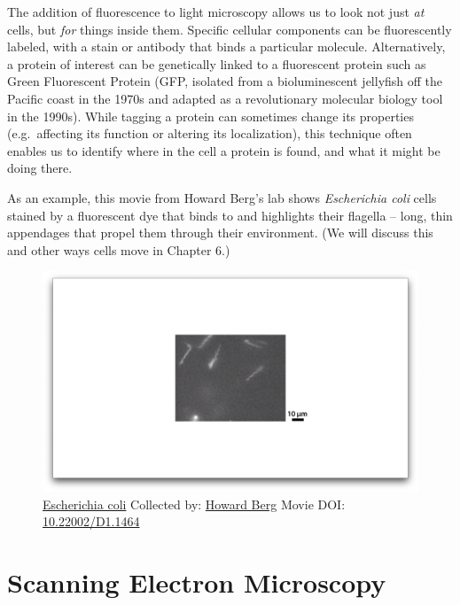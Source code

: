 \documentclass[]{tufte-book}
\begin{document}
The addition of fluorescence to light microscopy allows us to look not
just \emph{at} cells, but \emph{for} things inside them. Specific
cellular components can be fluorescently labeled, with a stain or
antibody that binds a particular molecule. Alternatively, a protein of
interest can be genetically linked to a fluorescent protein such as
Green Fluorescent Protein (GFP, isolated from a bioluminescent jellyfish
off the Pacific coast in the 1970s and adapted as a revolutionary
molecular biology tool in the 1990s). While tagging a protein can
sometimes change its properties (e.g.~affecting its function or altering
its localization), this technique often enables us to identify where in
the cell a protein is found, and what it might be doing there.

As an example, this movie from Howard Berg's lab \citep{bergInternet}
\citep{turner2000} shows \emph{Escherichia coli} cells stained by a
fluorescent dye that binds to and highlights their flagella -- long,
thin appendages that propel them through their environment. (We will
discuss this and other ways cells move in Chapter 6.)





\begin{figure}
\includegraphics{movie_stills/1_2} \caption[\protect\hyperlink{tree}{Escherichia coli} Collected by:
\protect\hyperlink{howard_berg}{Howard Berg} Movie DOI:
\href{https://doi.org/10.22002/D1.1464}{10.22002/D1.1464}]{\protect\hyperlink{tree}{Escherichia coli} Collected by:
\protect\hyperlink{howard_berg}{Howard Berg} Movie DOI:
\href{https://doi.org/10.22002/D1.1464}{10.22002/D1.1464}}\label{fig:1-2}
\end{figure}

\section{Scanning Electron
Microscopy}\label{scanning-electron-microscopy}
\end{document}
